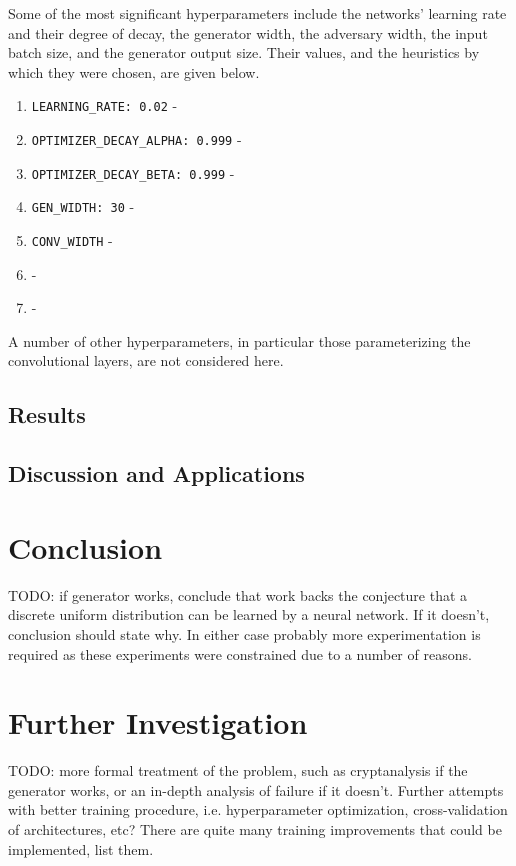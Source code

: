 \documentclass[12pt, titlepage]{report}
\theoremstyle{definition}
\begin{document}
Some of the most significant hyperparameters include the networks' learning rate and their degree of decay, the generator width, the adversary width, the input batch size, and the generator output size. Their values, and the heuristics by which they were chosen, are given below.

\begin{enumerate}
\item \texttt{LEARNING_RATE: 0.02} - 
\item \texttt{OPTIMIZER_DECAY_ALPHA: 0.999} - 
\item \texttt{OPTIMIZER_DECAY_BETA: 0.999} - 
\item \texttt{GEN_WIDTH: 30} - 
\item \texttt{CONV_WIDTH} - 
\item \texttt{} - 
\item \texttt{} - 
\end{enumerate}


A number of other hyperparameters, in particular those parameterizing the convolutional layers, are not considered here.


\section{Results}

\section{Discussion and Applications}


\chapter{Conclusion}\label{chapter:conclusion}
TODO: if generator works, conclude that work backs the conjecture that a discrete uniform distribution can be learned by a neural network. If it doesn't, conclusion should state why. In either case probably more experimentation is required as these experiments were constrained due to a number of reasons.


\chapter{Further Investigation}
TODO: more formal treatment of the problem, such as cryptanalysis if the generator works, or an in-depth analysis of failure if it doesn't. Further attempts with better training procedure, i.e. hyperparameter optimization, cross-validation of architectures, etc? There are quite many training improvements that could be implemented, list them.
\end{document}
